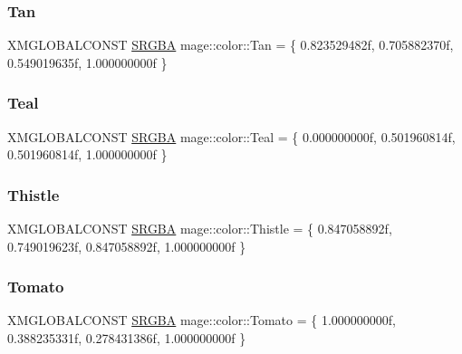 \hypertarget{namespacemage_1_1color_ad1e6957f59027fe43fb973ded05cde79}{}\label{namespacemage_1_1color_ad1e6957f59027fe43fb973ded05cde79} 
\subsubsection{\texorpdfstring{Tan}{Tan}}
{\footnotesize\ttfamily X\+M\+G\+L\+O\+B\+A\+L\+C\+O\+N\+ST \hyperlink{structmage_1_1_s_r_g_b_a}{S\+R\+G\+BA} mage\+::color\+::\+Tan = \{ 0.\+823529482f, 0.\+705882370f, 0.\+549019635f, 1.\+000000000f \}}

\hypertarget{namespacemage_1_1color_a5a7a616ec00a38afb3b2c97e22ef555d}{}\label{namespacemage_1_1color_a5a7a616ec00a38afb3b2c97e22ef555d} 
\subsubsection{\texorpdfstring{Teal}{Teal}}
{\footnotesize\ttfamily X\+M\+G\+L\+O\+B\+A\+L\+C\+O\+N\+ST \hyperlink{structmage_1_1_s_r_g_b_a}{S\+R\+G\+BA} mage\+::color\+::\+Teal = \{ 0.\+000000000f, 0.\+501960814f, 0.\+501960814f, 1.\+000000000f \}}

\hypertarget{namespacemage_1_1color_af0130361545ad1169a81e820fee4c8bf}{}\label{namespacemage_1_1color_af0130361545ad1169a81e820fee4c8bf} 
\subsubsection{\texorpdfstring{Thistle}{Thistle}}
{\footnotesize\ttfamily X\+M\+G\+L\+O\+B\+A\+L\+C\+O\+N\+ST \hyperlink{structmage_1_1_s_r_g_b_a}{S\+R\+G\+BA} mage\+::color\+::\+Thistle = \{ 0.\+847058892f, 0.\+749019623f, 0.\+847058892f, 1.\+000000000f \}}

\hypertarget{namespacemage_1_1color_a1f9596eae4cf47ef70b15c5a0cae26e5}{}\label{namespacemage_1_1color_a1f9596eae4cf47ef70b15c5a0cae26e5} 
\subsubsection{\texorpdfstring{Tomato}{Tomato}}
{\footnotesize\ttfamily X\+M\+G\+L\+O\+B\+A\+L\+C\+O\+N\+ST \hyperlink{structmage_1_1_s_r_g_b_a}{S\+R\+G\+BA} mage\+::color\+::\+Tomato = \{ 1.\+000000000f, 0.\+388235331f, 0.\+278431386f, 1.\+000000000f \}}

